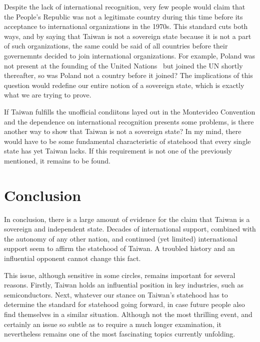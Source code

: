 \documentclass{article}
\begin{document}
Despite the lack of international recognition, 
very few people would claim that the People's Republic was not a legitimate country
during this time before its acceptance to international organizations in the 1970s. This 
standard cuts both ways, and by saying that Taiwan is not a sovereign state because it is 
not a part of such organizations, the same could be said of all countries before their 
governemnts decided to join international organizations. For example, Poland was not present
at the founding of the United Nations~\cite{UNHistory} but joined the UN shortly thereafter, so was Poland not a country before 
it joined? The implications of this question would redefine our entire notion of a sovereign state,
which is exactly what we are trying to prove.

If Taiwan fulfills the unofficial condiitons layed out in the Montevideo Convention and 
the dependence on international recognition presents some problems, is there another way to show
that Taiwan is not a sovereign state? In my mind, there would have to be some fundamental characteristic
of statehood that every single state has yet Taiwan lacks. If this requirement is not one 
of the previously mentioned, it remains to be found.

\section{Conclusion}
In conclusion, there is a large amount of evidence for the claim that Taiwan is a sovereign and 
independent state. Decades of international support, combined with the autonomy of any other 
nation, and continued (yet limited) international support seem to affirm the statehood of Taiwan.
A troubled history and an influential opponent cannot change this fact.

This issue, although sensitive in some circles, remains important for several reasons. Firstly,
Taiwan holds an influential position in key industries, such as semiconductors. Next, whatever
our stance on Taiwan's statehood has to determine the standard for statehood going forward, in case
future people also find themselves in a similar situation. Although not the most thrilling event, 
and certainly an issue so subtle as to require a much longer examination, it nevertheless remains 
one of the most fascinating topics currently unfolding.

\printbibliography
\end{document}
